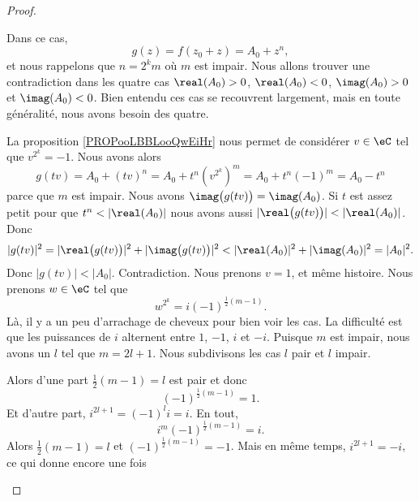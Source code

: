 \begin{proof}
\begin{subproof}
		\spitem[Si \( r=n\)]

		Dans ce cas,
		\begin{equation}
			g(z)=f(z_0+z)=A_0+z^n,
		\end{equation}
		et nous rappelons que \( n=2^km\) où \( m\) est impair. Nous allons trouver une contradiction dans les quatre cas \( \real(A_0)>0\), \( \real(A_0)<0\), \( \imag(A_0)>0\) et \( \imag(A_0)<0\). Bien entendu ces cas se recouvrent largement, mais en toute généralité, nous avons besoin des quatre.
		\begin{subproof}
			\spitem[Si \( \real(A_0)>0\)]
			La proposition \ref{PROPooLBBLooQwEiHr} nous permet de considérer \( v\in \eC\) tel que \( v^{2^k}=-1\). Nous avons alors
			\begin{equation}
				g(tv)=A_0+(tv)^n=A_0+t^n(v^{2^k})^m=A_0+t^n(-1)^m=A_0-t^n
			\end{equation}
			parce que \( m\) est impair. Nous avons \( \imag\big( g(tv) \big)=\imag(A_0)\). Si \( t\) est assez petit pour que \( t^n<| \real(A_0) |\) nous avons aussi \( |\real\big( g(tv) \big)|<| \real(A_0) |\). Donc
            \begin{equation}
				| g(tv) |^2=| \real\big( g(tv) \big) |^2+| \imag\big( g(tv) \big) |^2 < | \real(A_0) |^2+| \imag(A_0) |^2=| A_0 |^2.
			\end{equation}
			Donc \( | g(tv) |<| A_0 |\). Contradiction.
			\spitem[Si \( \real(A_0)<0\)]
			Nous prenons \( v=1\), et même histoire.
			\spitem[Si \( \imag(A_0)<0\)]
			Nous prenons \( w\in \eC\) tel que
			\begin{equation}
				w^{2^k}=i(-1)^{\frac{ 1 }{2}(m-1)}.
			\end{equation}
			Là, il y a un peu d'arrachage de cheveux pour bien voir les cas. La difficulté est que les puissances de \( i\) alternent entre \( 1\), \( -1\), \( i\) et \( -i\). Puisque \( m\) est impair, nous avons un \( l\) tel que \( m=2l+1\). Nous subdivisons les cas \( l\) pair et \( l\) impair.
			\begin{subproof}
				Alors d'une part \( \frac{ 1 }{2}(m-1)=l\) est pair et donc
				\begin{equation}
					(-1)^{\frac{ 1 }{2}(m-1)}=1.
				\end{equation}
				Et d'autre part, \( i^{2l+1}=(-1)^li=i\). En tout,
				\begin{equation}
					i^m(-1)^{\frac{ 1 }{2}(m-1)}=i.
				\end{equation}
				Alors \( \frac{ 1 }{2}(m-1)=l\) et \( (-1)^{\frac{ 1 }{2}(m-1)}=-1\). Mais en même temps, \( i^{2l+1}=-i\), ce qui donne encore une fois

\end{subproof}
\end{subproof}
\end{subproof}
\end{proof}
